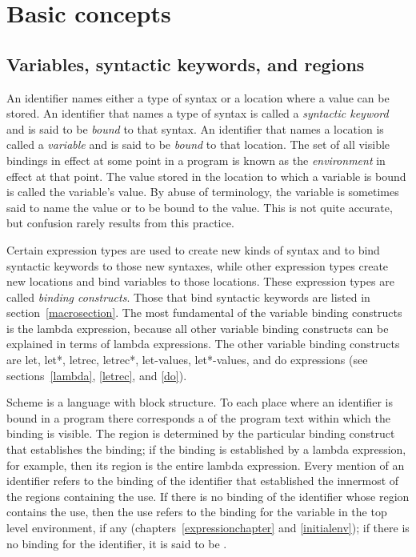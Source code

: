 \chapter{Basic concepts}
\label{basicchapter}

\section{Variables, syntactic keywords, and regions}
\label{specialformsection}
\label{variablesection}

An identifier names either a type of syntax or
a location where a value can be stored.  An identifier that names a type
of syntax is called a {\em syntactic keyword}
and is said to be {\em bound} to that syntax.  An identifier that names a
location is called a {\em variable} and is said to be
{\em bound} to that location.  The set of all visible
bindings in effect at some point in a program is
known as the {\em environment} in effect at that point.  The value
stored in the location to which a variable is bound is called the
variable's value.  By abuse of terminology, the variable is sometimes
said to name the value or to be bound to the value.  This is not quite
accurate, but confusion rarely results from this practice.

\vest Certain expression types are used to create new kinds of syntax
and to bind syntactic keywords to those new syntaxes, while other
expression types create new locations and bind variables to those
locations.  These expression types are called {\em binding constructs}.
Those that bind syntactic keywords are listed in section~\ref{macrosection}.
The most fundamental of the variable binding constructs is the
{\cf lambda} expression, because all other variable binding constructs
can be explained in terms of {\cf lambda} expressions.  The other
variable binding constructs are {\cf let}, {\cf let*}, {\cf letrec},
{\cf letrec*}, {\cf let-values}, {\cf let*-values},
and {\cf do} expressions (see sections~\ref{lambda}, \ref{letrec}, and
\ref{do}).


\vest Scheme is a language with
block structure.  To each place where an identifier is bound in a program
there corresponds a  of the program text within which
the binding is visible.  The region is determined by the particular
binding construct that establishes the binding; if the binding is
established by a {\cf lambda} expression, for example, then its region
is the entire {\cf lambda} expression.  Every mention of an identifier
refers to the binding of the identifier that established the
innermost of the regions containing the use.  If there is no binding of
the identifier whose region contains the use, then the use refers to the
binding for the variable in the top level environment, if any
(chapters~\ref{expressionchapter} and \ref{initialenv}); if there is no
binding for the identifier,
it is said to be .


